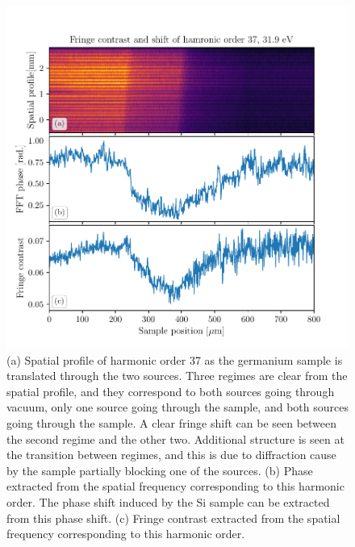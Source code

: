 \begin{figure}
	\centering
	\includegraphics[width=1.0\textwidth]{figures/refractive_index/spatialgram_fringe_shift_contrast_ge.pdf}
	\caption[Spatial profile and fringe shift of a harmonic as sample is translated across the two XUV sources]{(a) Spatial profile of harmonic order 37 as the germanium sample is translated through the two sources. Three regimes are clear from the spatial profile, and they correspond to both sources going through vacuum, only one source going through the sample, and both sources going through the sample.  A clear fringe shift can be seen between the second regime and the other two.  Additional structure is seen at the transition between regimes, and this is due to diffraction cause by the sample partially blocking one of the sources. (b) Phase extracted from the spatial frequency corresponding to this harmonic order.  The phase shift induced by the Si sample can be extracted from this phase shift. (c) Fringe contrast extracted from the spatial frequency corresponding to this harmonic order.}
	\label{fig:harmonic_fringe_shift_contrast_ge}
\end{figure}


